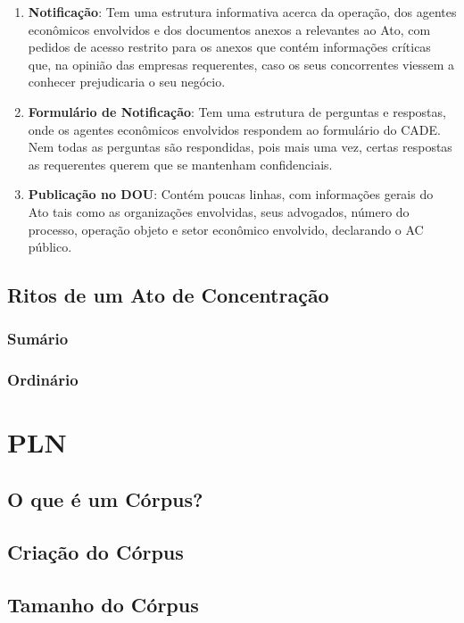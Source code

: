 \documentclass[11pt]{report}
\begin{document}
\begin{enumerate}[label=\textbf{\arabic*.}]
\item \textbf{Notificação}: Tem uma estrutura informativa acerca da operação, dos agentes econômicos envolvidos e dos documentos anexos a relevantes ao Ato, com pedidos
de acesso restrito para os anexos que contém informações críticas que, na opinião das empresas requerentes, caso os seus concorrentes viessem a conhecer prejudicaria o seu negócio.
\item \textbf{Formulário de Notificação}: Tem uma estrutura de perguntas e respostas, onde os agentes econômicos envolvidos respondem ao formulário do CADE. Nem todas as perguntas
são respondidas, pois mais uma vez, certas respostas as requerentes querem que se mantenham confidenciais.
\item \textbf{Publicação no DOU}: Contém poucas linhas, com informações gerais do Ato tais como as organizações envolvidas, seus advogados, número do processo, operação objeto
e setor econômico envolvido, declarando o AC público.
\end{enumerate}

\section{Ritos de um Ato de Concentração}

\subsection{Sumário}

\subsection{Ordinário}

\pagebreak
\chapter{PLN}
\section{O que é um Córpus?}
\section{Criação do Córpus}
\section{Tamanho do Córpus}
\end{document}
